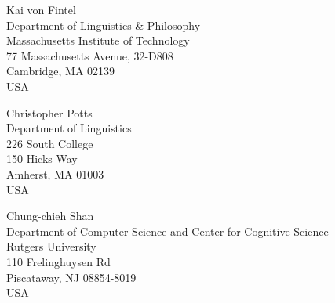 \documentclass[lucida,final]{sp}
\begin{document}
\begin{addresses}
  \begin{address}
    Kai von Fintel\\
    Department of Linguistics \& Philosophy\\
    Massachusetts Institute of Technology\\
    77 Massachusetts Avenue, 32-D808\\
    Cambridge, MA 02139\\
    USA\\
  \end{address}
  \begin{address}
    Christopher Potts\\
    Department of Linguistics\\
    226 South College\\
    150 Hicks Way\\
    Amherst, MA 01003\\
    USA\\
  \end{address}
  \begin{address}
    Chung-chieh Shan\\
    Department of Computer Science and Center for Cognitive Science\\
    Rutgers University\\
    110 Frelinghuysen Rd\\
    Piscataway, NJ 08854-8019\\
    USA\\
  \end{address}
\end{addresses}

\end{document}
